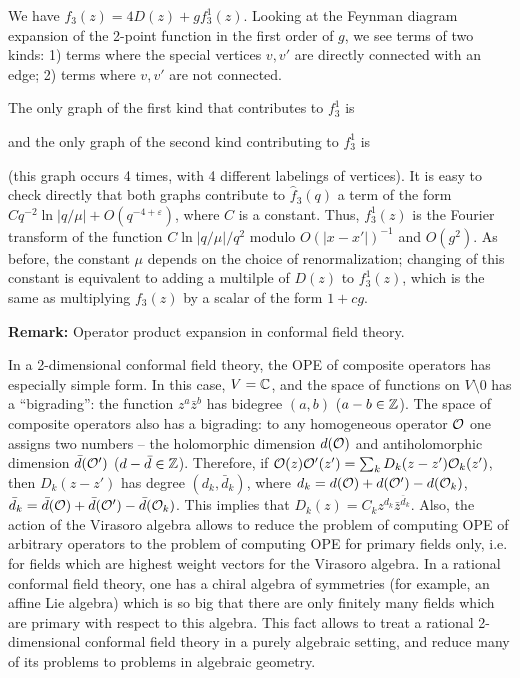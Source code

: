 \documentclass[11pt]{article}
\def\O{{\cal O}}
\def\Z{\Bbb Z}
\def\C{\Bbb C}
\def\e{\varepsilon}
\begin{document}
We have $f_3(z)=4D(z)+gf_3^1(z)$.
Looking at the Feynman diagram expansion of the 2-point 
function in the first order of $g$, we see terms of two kinds:
1) terms where the special vertices $v,v'$ are directly connected
with an edge; 2) terms where $v,v'$ are not connected. 

The only graph of the first kind that contributes to $f_3^1$ is

\begin{center} 
 
 
\end{center}


and the only graph of the second kind contributing to $f_3^1$ is


\begin{center} 
 
 
\end{center}


(this graph occurs 4 times, with 4 different labelings of vertices).
It is easy to check directly that both graphs contribute 
to $\hat f_3(q)$ a term of the form $Cq^{-2}\ln|q/\mu|+O(q^{-4+\e})$,
where $C$ is a constant. 
Thus, $f_3^1(z)$ is the Fourier transform of the function
$C\ln|q/\mu|/q^2$ modulo $O(|x-x'|)^{-1}$ and $O(g^2)$.    
As before, the constant $\mu$ depends on the choice of renormalization;
changing of this constant is equivalent to adding a multilple
of $D(z)$ to $f_3^1(z)$, which is the same as multiplying 
$f_3(z)$ by a scalar of the form $1+cg$.  

{\bf Remark:} Operator product expansion in conformal field theory.

In a 2-dimensional conformal field theory, the OPE of composite operators 
has especially simple form. In this case, $V=\C$, and the space of
functions on $V\setminus 0$ has a ``bigrading'': the function
$z^a\bar z^b$ has bidegree $(a,b)$ ($a-b\in\Z$).  
The space of composite operators also has a bigrading: to any
homogeneous operator $\O$ one assigns two numbers -- the holomorphic
dimension $d(\O)$ and antiholomorphic dimension $\bar d(\O')$
($d-\bar d\in \Z$). 
Therefore, if 
$\O(z)\O'(z')=\sum_k D_k(z-z')\O_k(z')$, then 
$D_k(z-z')$ has degree $(d_k,\bar d_k)$, where $d_k=d(\O)+d(\O')-
d(\O_k)$, $\bar d_k=\bar d(\O)+\bar d(\O')-
\bar d(\O_k)$. This implies that $D_k(z)=C_kz^{d_k}\bar z^{\bar d_k}$. 
Also, the action of the Virasoro algebra allows to reduce 
the problem of computing OPE of arbitrary operators to 
the problem of computing OPE for primary fields only, i.e. 
for fields which are highest weight vectors for the Virasoro algebra. 
In a rational conformal field theory, one has a chiral algebra
of symmetries (for example, an affine Lie algebra)
which is so big that there are only finitely many 
fields which are primary with respect to this algebra.     
This fact allows to treat a rational 2-dimensional conformal field theory 
in a purely algebraic setting, and reduce many of its problems to
problems in algebraic geometry. 
\end{document}
